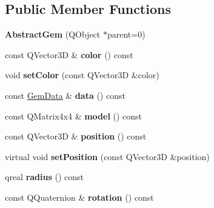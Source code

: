 \subsection*{Public Member Functions}
\begin{DoxyCompactItemize}
\item 
\hypertarget{class_abstract_gem_a489d032060a42a9a8475309105fc585d}{}{\bfseries Abstract\+Gem} (Q\+Object $\ast$parent=0)\label{class_abstract_gem_a489d032060a42a9a8475309105fc585d}

\item 
\hypertarget{class_abstract_gem_abb92885bcf86f43f069c9a0ef203d770}{}const Q\+Vector3\+D \& {\bfseries color} () const \label{class_abstract_gem_abb92885bcf86f43f069c9a0ef203d770}

\item 
\hypertarget{class_abstract_gem_ace63416f61034b73969b5a89e3913e6d}{}void {\bfseries set\+Color} (const Q\+Vector3\+D \&color)\label{class_abstract_gem_ace63416f61034b73969b5a89e3913e6d}

\item 
\hypertarget{class_abstract_gem_ac23fb212f3cca79b345f82e19f8c12d5}{}const \hyperlink{class_gem_data}{Gem\+Data} \& {\bfseries data} () const \label{class_abstract_gem_ac23fb212f3cca79b345f82e19f8c12d5}

\item 
\hypertarget{class_abstract_gem_a89f90d07bc8a780f053b3c6a5720aeed}{}const Q\+Matrix4x4 \& {\bfseries model} () const \label{class_abstract_gem_a89f90d07bc8a780f053b3c6a5720aeed}

\item 
\hypertarget{class_abstract_gem_a404114854610011363f6d7800985b718}{}const Q\+Vector3\+D \& {\bfseries position} () const \label{class_abstract_gem_a404114854610011363f6d7800985b718}

\item 
\hypertarget{class_abstract_gem_aaf11fa4b522dc334ebed4f2d031a3e2b}{}virtual void {\bfseries set\+Position} (const Q\+Vector3\+D \&position)\label{class_abstract_gem_aaf11fa4b522dc334ebed4f2d031a3e2b}

\item 
\hypertarget{class_abstract_gem_a628481ed4ebff7b282524a003d4392c2}{}qreal {\bfseries radius} () const \label{class_abstract_gem_a628481ed4ebff7b282524a003d4392c2}

\item 
\hypertarget{class_abstract_gem_a4fc9d6ed418b73ec2539e063ebfa70c1}{}const Q\+Quaternion \& {\bfseries rotation} () const \label{class_abstract_gem_a4fc9d6ed418b73ec2539e063ebfa70c1}


\end{DoxyCompactItemize}
